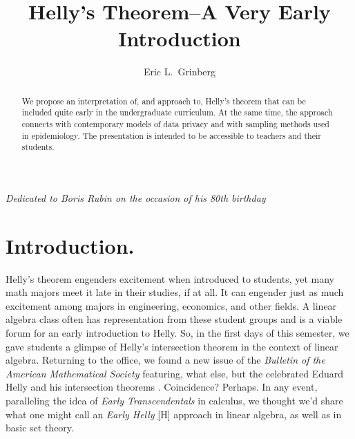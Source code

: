 \documentclass[11pt]
{amsart}
\begin{document}
\title
{Helly's Theorem--A Very Early Introduction
}

\author{Eric L.~Grinberg}
\date{} %

\newenvironment{acknowledgement}%
    {\large\bfseries Acknowledgement%
    \par\medskip\normalfont\normalsize}%
    {}%


\begin{abstract}
We propose an interpretation of, and approach to, Helly's theorem that can be included quite early in the undergraduate curriculum. At the same time, the approach connects with contemporary models of data privacy and with sampling methods used in epidemiology. The presentation is intended to be accessible to teachers and their students. \end{abstract}


\maketitle

\begin{center}
    \begin{minipage}{0.7\textwidth}
        \centering\small\textit{Dedicated to Boris Rubin on the occasion of his 80th birthday}
    \end{minipage}
\end{center}




\section{Introduction.}

Helly's theorem engenders excitement when introduced to students, yet many math majors meet it late in their studies, if at all. It can engender just as much excitement among majors in engineering, economics, and other fields. A linear algebra class often has representation from these student groups and is a viable forum for an early introduction to Helly. So, in the first days of this semester, we gave students a glimpse of Helly's intersection theorem in the context of linear algebra. Returning to the office, we found a new issue of the \emph{Bulletin of the American Mathematical Society} featuring, what else, but the celebrated Eduard Helly and his intersection theorems \cite{barany22, hauser22}. 
Coincidence?  Perhaps. In any event, paralleling the idea of \emph{Early Transcendentals} in calculus, we thought we’d share what one might call an \emph{Early Helly} \hyperlink{fig:cartoon}[H] approach in linear algebra, as well as in basic set theory.
\end{document}
